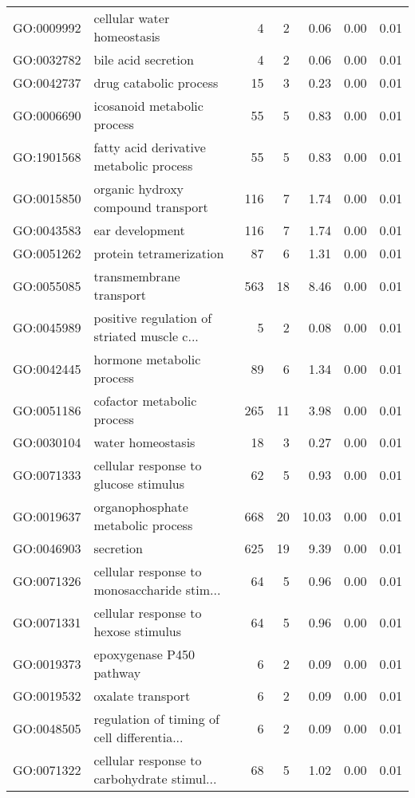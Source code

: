 \begin{table}[ht]
\begin{tabular}{llrrrrr}
  GO:0009992 & cellular water homeostasis &   4 &   2 & 0.06 & 0.00 & 0.01 \\ 
  GO:0032782 & bile acid secretion &   4 &   2 & 0.06 & 0.00 & 0.01 \\ 
  GO:0042737 & drug catabolic process &  15 &   3 & 0.23 & 0.00 & 0.01 \\ 
  GO:0006690 & icosanoid metabolic process &  55 &   5 & 0.83 & 0.00 & 0.01 \\ 
  GO:1901568 & fatty acid derivative metabolic process &  55 &   5 & 0.83 & 0.00 & 0.01 \\ 
  GO:0015850 & organic hydroxy compound transport & 116 &   7 & 1.74 & 0.00 & 0.01 \\ 
  GO:0043583 & ear development & 116 &   7 & 1.74 & 0.00 & 0.01 \\ 
  GO:0051262 & protein tetramerization &  87 &   6 & 1.31 & 0.00 & 0.01 \\ 
  GO:0055085 & transmembrane transport & 563 &  18 & 8.46 & 0.00 & 0.01 \\ 
  GO:0045989 & positive regulation of striated muscle c... &   5 &   2 & 0.08 & 0.00 & 0.01 \\ 
  GO:0042445 & hormone metabolic process &  89 &   6 & 1.34 & 0.00 & 0.01 \\ 
  GO:0051186 & cofactor metabolic process & 265 &  11 & 3.98 & 0.00 & 0.01 \\ 
  GO:0030104 & water homeostasis &  18 &   3 & 0.27 & 0.00 & 0.01 \\ 
  GO:0071333 & cellular response to glucose stimulus &  62 &   5 & 0.93 & 0.00 & 0.01 \\ 
  GO:0019637 & organophosphate metabolic process & 668 &  20 & 10.03 & 0.00 & 0.01 \\ 
  GO:0046903 & secretion & 625 &  19 & 9.39 & 0.00 & 0.01 \\ 
  GO:0071326 & cellular response to monosaccharide stim... &  64 &   5 & 0.96 & 0.00 & 0.01 \\ 
  GO:0071331 & cellular response to hexose stimulus &  64 &   5 & 0.96 & 0.00 & 0.01 \\ 
  GO:0019373 & epoxygenase P450 pathway &   6 &   2 & 0.09 & 0.00 & 0.01 \\ 
  GO:0019532 & oxalate transport &   6 &   2 & 0.09 & 0.00 & 0.01 \\ 
  GO:0048505 & regulation of timing of cell differentia... &   6 &   2 & 0.09 & 0.00 & 0.01 \\ 
  GO:0071322 & cellular response to carbohydrate stimul... &  68 &   5 & 1.02 & 0.00 & 0.01 \\ 

\end{tabular}
\end{table}
